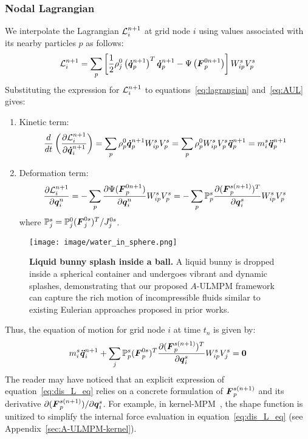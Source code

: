 \subsubsection{Nodal Lagrangian}
We interpolate the Lagrangian $\mathcal{L}_i^{n+1}$ at grid node $i$ using values  associated with its nearby particles $p$ as follows:
\begin{eqnarray}
    \mathcal{L}_i^{n+1}=\sum_p \left[\frac{1}{2}\rho_j^0 \left(\boldsymbol{\dot{q}}_p^{n+1}\right)^T\boldsymbol{\dot{q}}^{n+1}_p -\Psi\left(\boldsymbol{F}_p^{0{n+1}}\right)\right]W_{ip}^s V_p^s
    \label{eq:nodal_L}
\end{eqnarray}
Substituting the expression for $\mathcal{L}_i^{n+1}$ to equations~\eqref{eq:lagrangian} and~\eqref{eq:AUL} gives:
\begin{enumerate}
\item Kinetic term:
\begin{eqnarray}
     \frac{d}{dt}\left(\frac{\partial \mathcal{L}_i^{n+1}}{\partial \boldsymbol{\dot{q}}_i^{n+1}}\right)=\sum_p \rho_p^0 \boldsymbol{\dot{q}}_p^{n+1} W_{ip}^s V_p^s =\sum_p \rho_p^0  W_{ip}^s V_p^s\boldsymbol{\ddot{q}}_p^{n+1}=m_i^s\boldsymbol{\ddot{q}}_p^{n+1}
\end{eqnarray}
\item Deformation term:
\begin{eqnarray}
    \frac{\partial \mathcal{L}_i^{n+1}}{\partial \boldsymbol{q}_i^n}=-\sum_p \frac{\partial \Psi(\boldsymbol{F}_p^{0{n+1}})}{\partial\boldsymbol{q}_i^n} W_{ip}^s V_p^s= 
    -\sum_p\mathbb{P}_p^{s}  \frac{\partial (\boldsymbol{F}_p^{s(n+1)})^T}{\partial \boldsymbol{q}_i^s} W_{ip}^s V_p^s
\label{eq:defromation}
\end{eqnarray}
where $\mathbb{P}_j^s=\mathbb{P}_j^0(\boldsymbol{F}_j^{0s})^T/J_j^{0s}$. 
\end{enumerate}
\begin{figure*}[h]
    \centering
    \texttt{[image: image/water\_in\_sphere.png]}
     \vspace{-4mm}
     \caption{\textbf{Liquid bunny splash inside a ball.} A liquid bunny is dropped inside a spherical container and undergoes vibrant and dynamic splashes, demonstrating that our proposed $A$-ULMPM framework can capture the rich motion of incompressible fluids similar to existing Eulerian approaches proposed in prior works.}
    \label{fig:water}
    \vspace{-3mm}
\end{figure*}

Thus, the equation of motion for grid node $i$ at time $t_n$ is given by:
\begin{equation}
    m_i^s\boldsymbol{\ddot{q}}_i^{n+1}+\sum_j\mathbb{P}_p^s(\boldsymbol{F}_p^{0s})^T  \frac{\partial (\boldsymbol{F}_p^{s(n+1)})^T}{\partial \boldsymbol{q}_i^s} W_{ip}^s V_j^s=\boldsymbol{0}
    \label{eq:dis_L_eq}
\end{equation}
The reader may have noticed that an explicit expression of equation~\eqref{eq:dis_L_eq} relies on a concrete formulation of $\boldsymbol{F}_p^{s(n+1)}$ and its derivative ${\partial (\boldsymbol{F}_p^{s(n+1)})}/{\partial \boldsymbol{q}_i^s}$. 
For example, in kernel-MPM~\cite{Stomakhin:2013:MPMsnow}, the shape function is unitized to simplify the internal force evaluation in equation~\eqref{eq:dis_L_eq} (see Appendix~\ref{sec:A-ULMPM-kernel}). 

